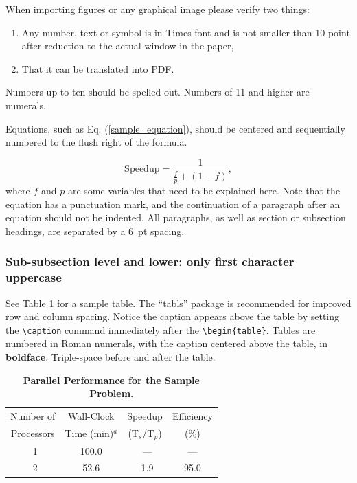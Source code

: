 \documentclass[letterpaper]{mc2023}
\begin{document}
When importing figures or any graphical image please verify two things:
\begin{enumerate} 
\item Any number, text or symbol is in Times font and is not smaller than 
  10-point after reduction to the actual window in the paper,
\item That it can be translated into PDF.
\end{enumerate}

Numbers up to ten should be spelled out. Numbers of 11 and higher are numerals.

Equations, such as Eq. (\ref{sample_equation}), should be centered and 
sequentially numbered to the flush right of the formula.

\begin{equation}
  \label{sample_equation}
  \mathrm{Speedup}=\frac{1}{\frac{f}{p}+(1-f)},
\end{equation}
where $f$ and $p$ are some variables that need to be explained here.  Note that the equation has a punctuation mark, and the continuation of a paragraph after an equation should not be indented.  
All paragraphs, as well as section or subsection headings, are separated by a 6~pt spacing.

\subsubsection{Sub-subsection level and lower: only first character uppercase}

See Table \ref{table:example} for a sample table.  The ``tabls'' package is
recommended for improved row and column spacing.  Notice the caption appears 
above the table by setting the \verb!\caption! command immediately 
after the \verb!\begin{table}!. Tables are numbered in Roman 
numerals, with the caption centered above the table, in \textbf{boldface}.  
Triple-space before and after the table.

\begin{table}[!htb]
  \centering
  \caption{\bf Parallel Performance for the Sample Problem.}
  \label{table:example} 
  \begin{tabular}{|c|c|c|c|} \hline 
   Number of & Wall-Clock & Speedup & Efficiency \\
   Processors & Time (min)$^a$& (T$_{s}$/T$_{p}$) & (\%) \\ \hline
    \ 1 &  100.0 & \ ---    & ---  \\ \hline
    \ 2 &   52.6 & \ 1.9    & 95.0 \\ \hline 
  \end{tabular}
\end{table}
\end{document}
